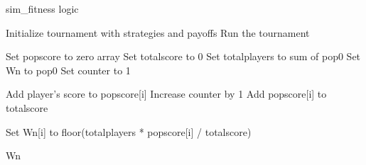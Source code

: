\documentclass[12pt]{report}
\begin{document}
\begin{algorithm}
\caption{sim\_fitness logic}
\begin{algorithmic}[1]


\State Initialize tournament with strategies and payoffs  
\State Run the tournament

\State Set popscore to zero array  
\State Set totalscore to 0  
\State Set totalplayers to sum of pop0  
\State Set Wn to pop0  
\State Set counter to 1

        \State Add player’s score to popscore[i]  
        \State Increase counter by 1  
    \EndFor
    \State Add popscore[i] to totalscore  
\EndFor

    \State Set Wn[i] to floor(totalplayers * popscore[i] / totalscore)  
\EndFor

\Return Wn

\end{algorithmic}
\end{algorithm}

\clearpage
\end{document}
